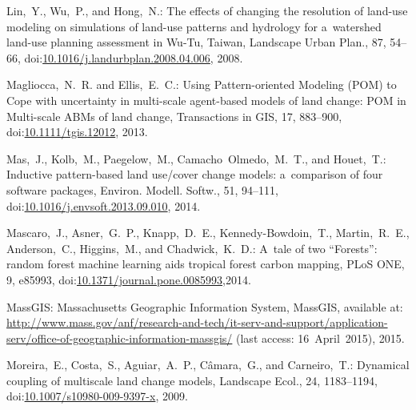 \documentclass[gmdd, online, hvmath]{copernicus}
\begin{document}
\begin{thebibliography}{97}
   Lin,~Y.,
    Wu,~P., and Hong,~N.: The effects of changing the resolution of
    land-use modeling on simulations of land-use patterns and
    hydrology for a~watershed land-use planning assessment in {Wu-Tu},
    Taiwan, Landscape Urban Plan., 87, 54--66,
    doi:\href{http://dx.doi.org/10.1016/j.landurbplan.2008.04.006}{10.1016/j.landurbplan.2008.04.006}, 2008.


    Magliocca,~N.~R. and Ellis,~E.~C.: Using Pattern-oriented Modeling
    {(POM)} to Cope with uncertainty in multi-scale agent-based models
    of land change: {POM} in Multi-scale {ABMs} of land change,
    Transactions in GIS, 17, 883--900,
doi:\href{http://dx.doi.org/10.1111/tgis.12012}{10.1111/tgis.12012}, 2013.


   Mas,~J., Kolb,~M., Paegelow,~M.,
    Camacho~Olmedo,~M.~T., and Houet,~T.: Inductive pattern-based land
    use/cover change models: a~comparison of four software packages,
    Environ. Modell. Softw., 51, 94--111,
    doi:\href{http://dx.doi.org/10.1016/j.envsoft.2013.09.010}{10.1016/j.envsoft.2013.09.010}, 2014.


   Mascaro,~J., Asner,~G.~P., Knapp,~D.~E.,
    {Kennedy-Bowdoin},~T., Martin,~R.~E., Anderson,~C., Higgins,~M.,
    and Chadwick,~K.~D.: A~tale of two ``Forests'': random forest
    machine learning aids tropical forest carbon mapping, {PLoS}
    {ONE}, 9, e85993,
doi:\href{http://dx.doi.org/10.1371/journal.pone.0085993}{10.1371/journal.pone.0085993},2014.


   {MassGIS}: Massachusetts
    Geographic Information System, MassGIS, available at:
    \url{http://www.mass.gov/anf/research-and-tech/it-serv-and-support/application-serv/office-of-geographic-information-massgis/}
    (last access: 16~April~2015), 2015.


   Moreira,~E., Costa,~S.,
    Aguiar,~A.~P., C\^{a}mara,~G., and Carneiro,~T.: Dynamical
    coupling of multiscale land change models, Landscape Ecol., 24,
    1183--1194,
doi:\href{http://dx.doi.org/10.1007/s10980-009-9397-x}{10.1007/s10980-009-9397-x}, 2009.



\end{thebibliography}
\end{document}
